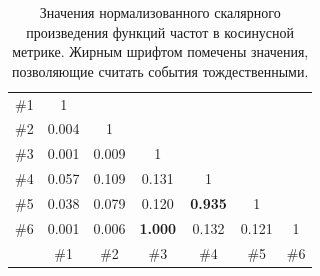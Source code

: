 \documentclass[12pt, a4paper]{article}
\begin{document}
	\begin{table}[H]
	\centering
	\begin{tabular}{ r | c  c  c  c  c  c }
	\#1 & 1 &  &  &  &  &  \\ 
	\#2 & 0.004 & 1 &  &  &  &  \\ 
	\#3 & 0.001 & 0.009 & 1 &  &  &  \\ 
	\#4 & 0.057 & 0.109 & 0.131 & 1 &  &  \\ 
	\#5 & 0.038 & 0.079 & 0.120 & \textbf{0.935} & 1 &  \\ 
	\#6 & 0.001 & 0.006 & \textbf{1.000} & 0.132 & 0.121 & 1 \\ \hline
	& \#1 & \#2 & \#3 & \#4 & \#5 & \#6 \\
	\end{tabular}
	\caption{Значения нормализованного скалярного произведения функций частот в косинусной метрике. Жирным шрифтом помечены значения, позволяющие считать события тождественными.}
	\label{dotprod-table}
	\end{table}
	
\end{document}
